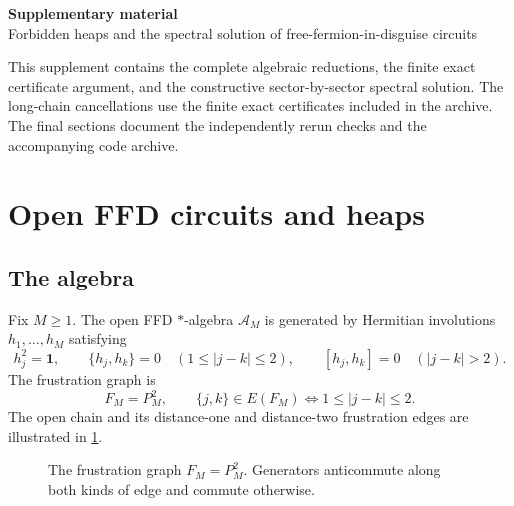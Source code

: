 \documentclass[10pt,letterpaper]{article}
\newcommand{\Aalg}{\mathcal A}
\newcommand{\one}{\mathbf 1}
\begin{document}
\clearpage\onecolumn
\setcounter{page}{1}
\setcounter{section}{0}
\setcounter{equation}{0}
\setcounter{theorem}{0}
\setcounter{figure}{0}
\setcounter{table}{0}
\setcounter{algorithm}{0}
\renewcommand{\headrulewidth}{0.25pt}
\begin{center}
{\Large\bfseries Supplementary material}\\[0.4em]
{\large Forbidden heaps and the spectral solution of free-fermion-in-disguise circuits}
\end{center}
\noindent This supplement contains the complete algebraic reductions, the finite exact certificate argument, and the constructive sector-by-sector spectral solution. The long-chain cancellations use the finite exact certificates included in the archive. The final sections document the independently rerun checks and the accompanying code archive.
\vspace{0.6em}
\section{Open FFD circuits and heaps}\label{sec:setup}

\subsection{The algebra}

Fix \(M\ge1\).  The open FFD \(*\)-algebra \(\Aalg_M\) is generated by Hermitian involutions \(h_1,\ldots,h_M\) satisfying
\begin{equation}\label{eq:ffd-algebra}
 h_j^2=\one,
 \qquad
 \{h_j,h_k\}=0 \quad (1\le |j-k|\le2),
 \qquad
 [h_j,h_k]=0 \quad (|j-k|>2).
\end{equation}
The frustration graph is
\[
 F_M=P_M^2,
 \qquad
 \{j,k\}\in E(F_M)\Longleftrightarrow 1\le|j-k|\le2.
\]
The open chain and its distance-one and distance-two frustration edges are illustrated in \cref{fig:ffd-graph}.

\begin{figure}[H]
\centering
{}
\caption{The frustration graph \(F_M=P_M^2\).  Generators anticommute along both kinds of edge and commute otherwise.}
\label{fig:ffd-graph}
\end{figure}
\end{document}
